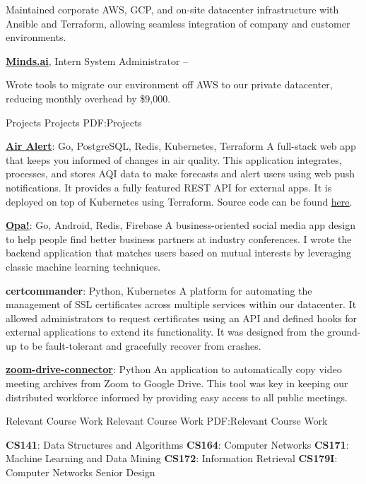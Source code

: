 \documentclass[letterpaper,MMMyyyy,nonstopmode]{simpleresumecv}
\begin{document}
\begin{Body}
\BulletItem
Maintained corporate AWS, GCP, and on-site datacenter infrastructure with Ansible and Terraform, allowing
seamless integration of company and customer environments.

\BigGap

\Entry
\href{https://minds.ai}
{\textbf{Minds.ai}}, 
Intern System Administrator
\hfill {} -- 
\Gap

\BulletItem
Wrote tools to migrate our 
environment off AWS to our private datacenter, reducing monthly overhead by \$9,000.

\BigGap


\Section
{Projects}
{Projects}
{PDF:Projects}

\Entry
\href{https://airalert.app}
{\textbf{Air Alert}}: Go, PostgreSQL, Redis, Kubernetes, Terraform
\BulletItem
A full-stack web app that keeps you informed of changes in air quality. This application
integrates, processes, and stores AQI data to make forecasts and alert users using web push 
notifications. It provides a fully featured REST API for external apps. It is deployed on 
top of Kubernetes using Terraform. Source code
can be found \href{https://github.com/MrFlynn/air-alert}{\underline{here}}.
\hfill
\BigGap

\Entry
\href{https://github.com/opa-social}
{\textbf{Opa!}}: Go, Android, Redis, Firebase
\BulletItem
A business-oriented social media app design to help people find better business partners
at industry conferences. I wrote the backend application that matches users based on 
mutual interests by leveraging classic machine learning techniques.
\hfill
\BigGap

\Entry
{\textbf{certcommander}}: Python, Kubernetes
\BulletItem
A platform for automating the management of SSL certificates across multiple services within our 
datacenter. It allowed administrators to request certificates using an API and defined hooks for
external applications to extend its functionality. It was designed from the ground-up to be
fault-tolerant and gracefully recover from crashes.
\hfill
\BigGap

\Entry
\href{https://github.com/minds-ai/zoom-drive-connector}
{\textbf{zoom-drive-connector}}: Python
\BulletItem
An application to automatically copy video meeting archives from Zoom to Google Drive. This tool was key
in keeping our distributed workforce informed by providing easy access to all public meetings.
\hfill
\BigGap


\Section
{Relevant Course Work}
{Relevant Course Work}
{PDF:Relevant Course Work}

\BulletItem\textbf{CS141}: Data Structures and Algorithms
\BulletItem\textbf{CS164}: Computer Networks
\BulletItem\textbf{CS171}: Machine Learning and Data Mining
\BulletItem\textbf{CS172}: Information Retrieval
\BulletItem\textbf{CS179I}: Computer Networks Senior Design

\end{Body}
\end{document}
